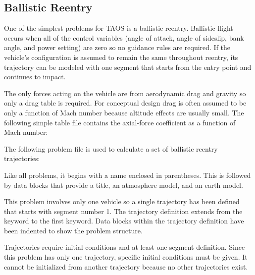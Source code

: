 \subsection{Ballistic Reentry}\label{sec:example-ballistic-reentry}

One of the simplest problems for TAOS is a ballistic reentry. Ballistic flight occurs
when all of the control variables (angle of attack, angle of sideslip, bank angle, and
power setting) are zero so no guidance rules are required. If the vehicle's
configuration is assumed to remain the same throughout reentry, its trajectory can
be modeled with one segment that starts from the entry point and continues to
impact.


The only forces acting on the vehicle are from aerodynamic drag and gravity so only
a drag table is required. For conceptual design drag is often assumed to be only a
function of Mach number because altitude effects are usually small. The following
simple table file contains the axial-force coefficient as a function of Mach number:




The following problem file is used to calculate a set of ballistic reentry trajectories:



Like all problems, it begins with a name enclosed in parentheses. This is followed by
data blocks that provide a title, an atmosphere model, and an earth model.

This problem involves only one vehicle so a single trajectory has been defined that
starts with segment number 1. The trajectory definition extends from the
 keyword to the first  keyword.
Data blocks within the trajectory definition have been indented to show the problem
structure.


Trajectories require initial conditions and at least one segment definition. Since this
problem has only one trajectory, specific initial conditions must be given. It cannot
be initialized from another trajectory because no other trajectories exist.

